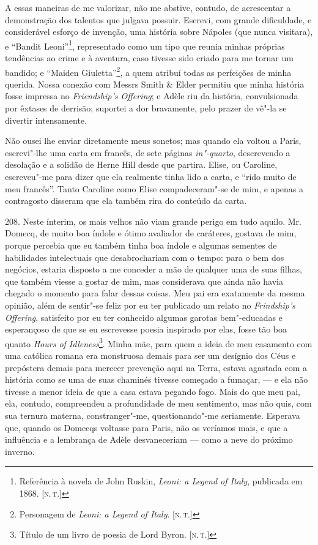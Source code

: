 A essas maneiras de me valorizar, não me abstive, contudo, de
acrescentar a demonstração dos talentos que julgava possuir. Escrevi,
com grande dificuldade, e considerável esforço de invenção, uma história
sobre Nápoles (que nunca visitara), e ``Bandit Leoni''\footnote{Referência
  à novela de John Ruskin, \emph{Leoni: a Legend of Italy}, publicada em
  1868. {[}\textsc{n.\,t.}{]}}, representado como um tipo que reunia minhas
próprias tendências ao crime e à aventura, caso tivesse sido criado para
me tornar um bandido; e ``Maiden Giuletta''\footnote{Personagem de
  \emph{Leoni: a Legend of Italy}. {[}\textsc{n.\,t.}{]}}, a quem atribuí todas
as perfeições de minha querida. Nossa conexão com Messrs Smith \& Elder
permitiu que minha história fosse impressa no \emph{Friendship's
Offering}; e Adèle riu da história, convulsionada por êxtases de
derrisão; suportei a dor bravamente, pelo prazer de vê"-la se divertir
intensamente.

Não ousei lhe enviar diretamente meus sonetos; mas quando ela voltou a
Paris, escrevi"-lhe uma carta em francês, de sete páginas
\emph{in"-quarto}, descrevendo a desolação e a solidão de Herne Hill
desde que partira. Elise, ou Caroline, escreveu"-me para dizer que ela
realmente tinha lido a carta, e ``rido muito de meu francês''. Tanto
Caroline como Elise compadeceram"-se de mim, e apenas a contragosto
disseram que ela também rira do conteúdo da carta.

208. Neste ínterim, os mais velhos não viam grande perigo em tudo
aquilo. Mr.\,Domecq, de muito boa índole e ótimo avaliador de caráteres,
gostava de mim, porque percebia que eu também tinha boa índole e algumas
sementes de habilidades intelectuais que desabrochariam com o tempo:
para o bem dos negócios, estaria disposto a me conceder a mão de
qualquer uma de suas filhas, que também viesse a gostar de mim, mas
considerava que ainda não havia chegado o momento para falar dessas
coisas. Meu pai era exatamente da mesma opinião, além de sentir"-se feliz
por eu ter publicado um relato no \emph{Frindship's Offering},
satisfeito por eu ter conhecido algumas garotas bem"-educadas e
esperançoso de que se eu escrevesse poesia inspirado por elas, fosse tão
boa quanto \emph{Hours of Idleness}\footnote{Título de um livro de
  poesia de Lord Byron. {[}\textsc{n.\,t.}{]}}. Minha mãe, para quem a
ideia de meu casamento com uma católica romana era monstruosa demais
para ser um desígnio dos Céus e prepóstera demais para merecer prevenção
aqui na Terra, estava agastada com a história como se uma de suas
chaminés tivesse começado a fumaçar, --- e ela não tivesse a menor ideia
de que a casa estava pegando fogo. Mais do que meu pai, ela, contudo,
compreendeu a profundidade de meu sentimento, mas não quis, com sua
ternura materna, constranger"-me, questionando"-me seriamente. Esperava
que, quando os Domecqs voltasse para Paris, não os veríamos mais, e que
a influência e a lembrança de Adèle desvaneceriam --- como a neve do
próximo inverno.

